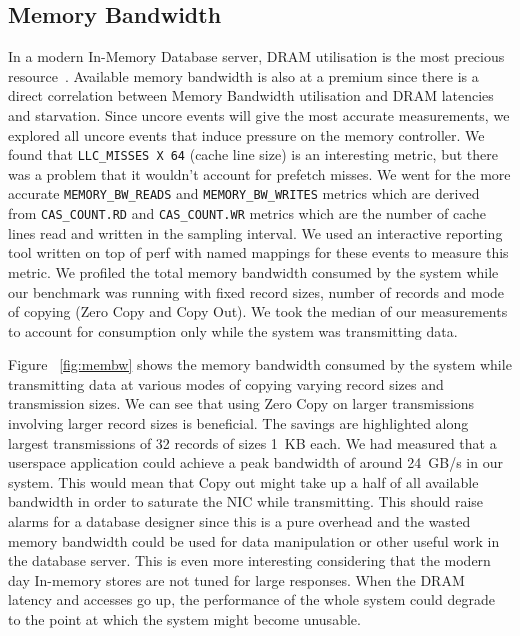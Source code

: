 


\subsection{Memory Bandwidth}
In a modern In-Memory Database server, DRAM utilisation is the most precious resource~\cite{ramcloudfast}. 
 Available memory bandwidth is also at a premium since there is a direct correlation between Memory Bandwidth
 utilisation and DRAM latencies and starvation. Since uncore events will give the most accurate measurements,
 we explored all uncore events that induce pressure on the memory controller. We found that 
\texttt{LLC\_MISSES X 64} (cache line size) is an interesting metric, but there was a problem that it wouldn't account for prefetch 
 misses. We went for the more accurate \texttt{MEMORY\_BW\_READS} and \texttt{MEMORY\_BW\_WRITES} metrics which are derived from 
 \texttt{CAS\_COUNT.RD} and \texttt{CAS\_COUNT.WR} metrics which are the number of cache lines read and written in the sampling 
 interval. We used an interactive reporting tool written on top of perf with named mappings for these events
 to measure this metric. We profiled the total memory bandwidth consumed by the system while our benchmark 
 was running with fixed record sizes, number of records and mode of copying (Zero Copy and Copy Out). We took the median of our measurements 
 to account for consumption only while the system was transmitting data.


Figure ~\ref{fig:membw} shows the memory bandwidth consumed by the system while transmitting data at various modes 
of copying varying record sizes and transmission sizes. We can see that using Zero Copy on larger transmissions involving 
larger record sizes is beneficial. The savings are highlighted along largest transmissions of 32 records of sizes 1~KB each. 
 We had measured that a userspace application could achieve a peak bandwidth of around 24~GB/s in our system. This would mean that Copy out 
 might take up a half of all available bandwidth in order to saturate the NIC while transmitting. This should raise alarms for a database 
 designer since this is a pure overhead and the wasted memory bandwidth could be used for data manipulation or other useful work in the database 
 server. This is even more interesting considering that the modern day In-memory stores are not tuned for large responses.
  When the DRAM latency and accesses go up, the performance of the whole system could degrade to the point at which the system might become unusable.


